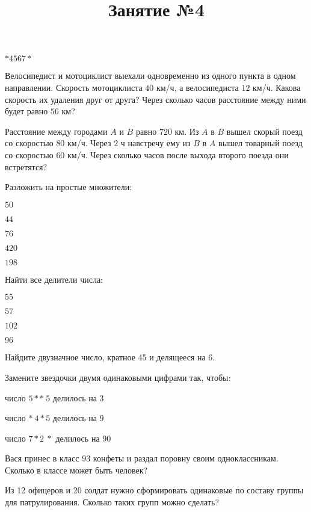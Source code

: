 \begin{listofex}
\begin{enumcols}[itemcolumns=2]
		\item \( *4567* \)
	\end{enumcols}
	\item Велосипедист и мотоциклист выехали одновременно из одного пункта в одном направлении. Скорость мотоциклиста \( 40 \) км/ч, а велосипедиста \( 12 \) км/ч. Какова скорость их удаления друг от друга? Через сколько часов расстояние между ними будет равно \( 56 \) км?
	\item Расстояние между городами \( A \) и \( B \) равно \( 720 \) км. Из \( A \) в \( B \) вышел скорый поезд со скоростью \( 80 \) км/ч. Через \( 2 \) ч навстречу ему из \( B \) в \( A \) вышел товарный поезд со скоростью \( 60 \) км/ч. Через сколько часов после выхода второго поезда они встретятся?
\end{listofex}
\newpage
\title{Занятие №4}
\begin{listofex}
	\item Разложить на простые множители:
	\begin{enumcols}[itemcolumns=5]
		\item \( 50 \)
		\item \( 44 \)
		\item \( 76 \)
		\item \( 420 \)
		\item \( 198 \)
	\end{enumcols}
	\item Найти все делители числа:
	\begin{enumcols}[itemcolumns=4]
		\item \( 55 \)
		\item \( 57 \)
		\item \( 102 \)
		\item \( 96 \)
	\end{enumcols}
	\item Найдите двузначное число, кратное 45 и делящееся на 6.
	\item Замените звездочки двумя одинаковыми цифрами так, чтобы:
	\begin{enumcols}[itemcolumns=1]
		\item число \( 5**\:5 \) делилось на \( 3 \)
		\item число \( *\:4*5 \) делилось на \( 9 \)
		\item число \( 7*2\:* \) делилось на \( 90 \)
	\end{enumcols}
	\item Вася принес в класс 93 конфеты и раздал поровну своим одноклассникам. Сколько в классе может быть человек?
	\item Из 12 офицеров и 20 солдат нужно сформировать одинаковые по составу группы для патрулирования. Сколько таких групп можно сделать?

\end{listofex}
